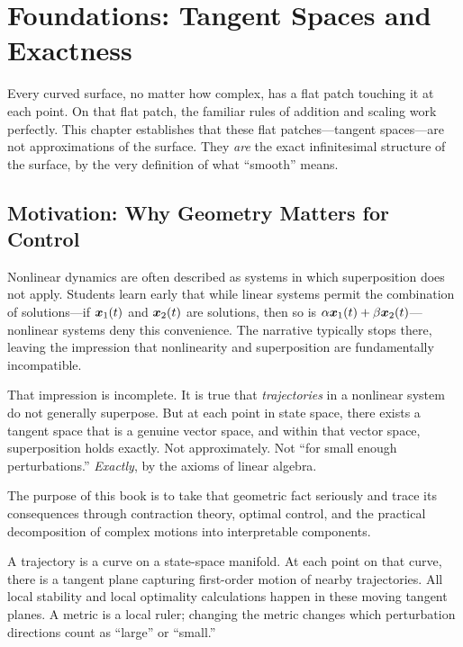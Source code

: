 \chapter{Foundations: Tangent Spaces and Exactness}
\label{ch:foundations}

\begin{laymansbox}
Every curved surface, no matter how complex, has a flat patch touching it at each point.
On that flat patch, the familiar rules of addition and scaling work perfectly.
This chapter establishes that these flat patches---tangent spaces---are not approximations
of the surface. They \emph{are} the exact infinitesimal structure of the surface, by the
very definition of what ``smooth'' means.
\end{laymansbox}

\section{Motivation: Why Geometry Matters for Control}

Nonlinear dynamics are often described as systems in which superposition does not apply.
Students learn early that while linear systems permit the combination of solutions---if
$\bm{x}_1(t)$ and $\bm{x}_2(t)$ are solutions, then so is $\alpha\bm{x}_1(t)+\beta\bm{x}_2(t)$---nonlinear
systems deny this convenience. The narrative typically stops there, leaving the impression
that nonlinearity and superposition are fundamentally incompatible.

That impression is incomplete. It is true that \emph{trajectories} in a nonlinear system
do not generally superpose. But at each point in state space, there exists a tangent space
that is a genuine vector space, and within that vector space, superposition holds exactly.
Not approximately. Not ``for small enough perturbations.'' \emph{Exactly}, by the axioms
of linear algebra.

The purpose of this book is to take that geometric fact seriously and trace its consequences
through contraction theory, optimal control, and the practical decomposition of complex
motions into interpretable components.

\begin{intuitionbox}
A trajectory is a curve on a state-space manifold. At each point on that curve, there is
a tangent plane capturing first-order motion of nearby trajectories. All local stability
and local optimality calculations happen in these moving tangent planes. A metric is a
local ruler; changing the metric changes which perturbation directions count as ``large''
or ``small.''
\end{intuitionbox}


